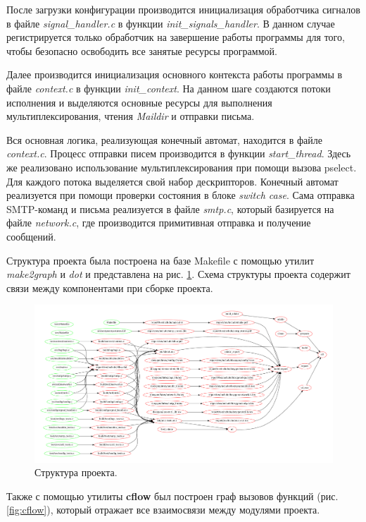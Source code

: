 \documentclass[a4paper,12pt]{report}
\begin{document}
	После загрузки конфигурации производится инициализация обработчика сигналов в файле \textit{signal\_handler.c} в функции \textit{init\_signals\_handler}. В данном случае регистрируется только обработчик на завершение работы программы для того, чтобы безопасно освободить все занятые ресурсы программой.
	
	Далее производится инициализация основного контекста работы программы в файле \textit{context.c} в функции \textit{init\_context}. На данном шаге создаются потоки исполнения и выделяются основные ресурсы для выполнения мультиплексирования, чтения \textit{Maildir} и отправки письма.

	Вся основная логика, реализующая конечный автомат, находится в файле \textit{context.c}. Процесс отправки писем производится в функции \textit{start\_thread}. Здесь же реализовано использование мультиплексирования при помощи вызова pselect. Для каждого потока выделяется свой набор дескрипторов. Конечный автомат реализуется при помощи проверки состояния в блоке \textit{switch case}. Сама отправка SMTP-команд и письма реализуется в файле \textit{smtp.c}, который базируется на файле \textit{network.c}, где производится примитивная отправка и получение сообщений.

	Структура проекта была построена на базе Makefile с помощью утилит \textit{make2graph} и \textit{dot} и представлена на рис. \ref{fig:makeclient}. Схема структуры проекта содержит связи между компонентами при сборке проекта.

	\begin{figure}[H]
	\centering
	\includegraphics[width=\textwidth]{./include/make.pdf}
	\caption{Структура проекта.}
	\label{fig:makeclient}
	\end{figure}

	Также с помощью утилиты \textbf{cflow} был построен граф вызовов функций (рис. \ref{fig:cflow}), который отражает все взаимосвязи между модулями проекта.
	
\end{document}
